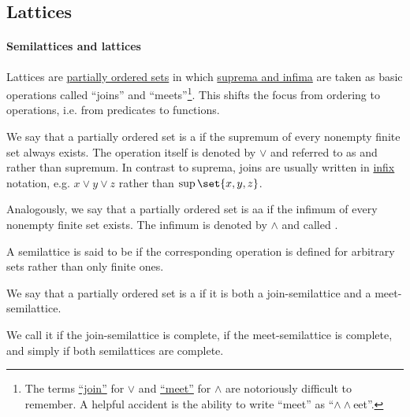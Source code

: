 \subsection{Lattices}\label{subsec:lattices}

\paragraph{Semilattices and lattices}

\begin{definition}\label{def:semilattice}
  Lattices are \hyperref[def:partially_ordered_set]{partially ordered sets} in which \hyperref[def:extremal_points/supremum_and_infimum]{suprema and infima} are taken as basic operations called \enquote{joins} and \enquote{meets}\footnote{The terms \hyperref[def:semilattice/join]{\enquote{join}} for \( \vee \) and \hyperref[def:semilattice/meet]{\enquote{meet}} for \( \wedge \) are notoriously difficult to remember. A helpful accident is the ability to write \enquote{meet} as \enquote{\( \wedge \wedge \)eet}.}. This shifts the focus from ordering to operations, i.e. from predicates to functions.

  \begin{thmenum}[series=def:semilattice]
     We say that a partially ordered set is a  if the supremum of every nonempty finite set always exists. The operation itself is denoted by \( \vee \) and referred to as  and rather than supremum. In contrast to suprema, joins are usually written in \hyperref[rem:first_order_formula_conventions/infix]{infix} notation, e.g. \( x \vee y \vee z \) rather than \( \sup\set{ x, y, z } \).

     Analogously, we say that a partially ordered set is aa  if the infimum of every nonempty finite set exists. The infimum is denoted by \( \wedge \) and called .

     A semilattice is said to be  if the corresponding operation is defined for arbitrary sets rather than only finite ones.

     We say that a partially ordered set is a  if it is both a join-semilattice and a meet-semilattice.

    We call it  if the join-semilattice is complete,  if the meet-semilattice is complete, and simply  if both semilattices are complete.


\end{thmenum}
\end{definition}
